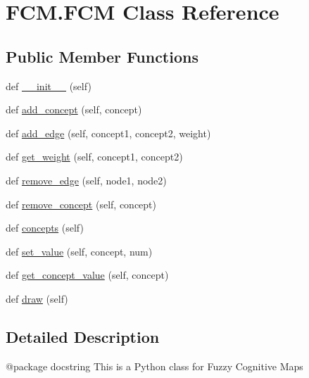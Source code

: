 \hypertarget{class_f_c_m_1_1_f_c_m}{}\section{F\+C\+M.\+F\+CM Class Reference}
\label{class_f_c_m_1_1_f_c_m}
\subsection*{Public Member Functions}
\begin{DoxyCompactItemize}
\item 
def \hyperlink{class_f_c_m_1_1_f_c_m_aba98e39a31a4bd9cb8eb8887dd98bbc0}{\+\_\+\+\_\+init\+\_\+\+\_\+} (self)
\item 
def \hyperlink{class_f_c_m_1_1_f_c_m_a57dff35d123327af6d02f335a49c4177}{add\+\_\+concept} (self, concept)
\item 
def \hyperlink{class_f_c_m_1_1_f_c_m_a4e32ab9228e8f678e6892092d643062d}{add\+\_\+edge} (self, concept1, concept2, weight)
\item 
def \hyperlink{class_f_c_m_1_1_f_c_m_a619a5925ca824a4e633378e2ceeca1fd}{get\+\_\+weight} (self, concept1, concept2)
\item 
def \hyperlink{class_f_c_m_1_1_f_c_m_a672188f630f4a42d330f7dc967933054}{remove\+\_\+edge} (self, node1, node2)
\item 
def \hyperlink{class_f_c_m_1_1_f_c_m_afcc0b9388e36ebe07b5b3b6c6d877a05}{remove\+\_\+concept} (self, concept)
\item 
def \hyperlink{class_f_c_m_1_1_f_c_m_abd95880fc46feca8042343b1556b61f1}{concepts} (self)
\item 
def \hyperlink{class_f_c_m_1_1_f_c_m_a55a0daf5c9eecef4639bb15ded281aa5}{set\+\_\+value} (self, concept, num)
\item 
def \hyperlink{class_f_c_m_1_1_f_c_m_ae764998f2c68740a4e80de8104da992d}{get\+\_\+concept\+\_\+value} (self, concept)
\item 
def \hyperlink{class_f_c_m_1_1_f_c_m_a97f12131aafc3d810da3ff95fb69ae1d}{draw} (self)
\end{DoxyCompactItemize}


\subsection{Detailed Description}
\begin{DoxyVerb}@package docstring
This is a Python class for Fuzzy Cognitive Maps\end{DoxyVerb}
 

